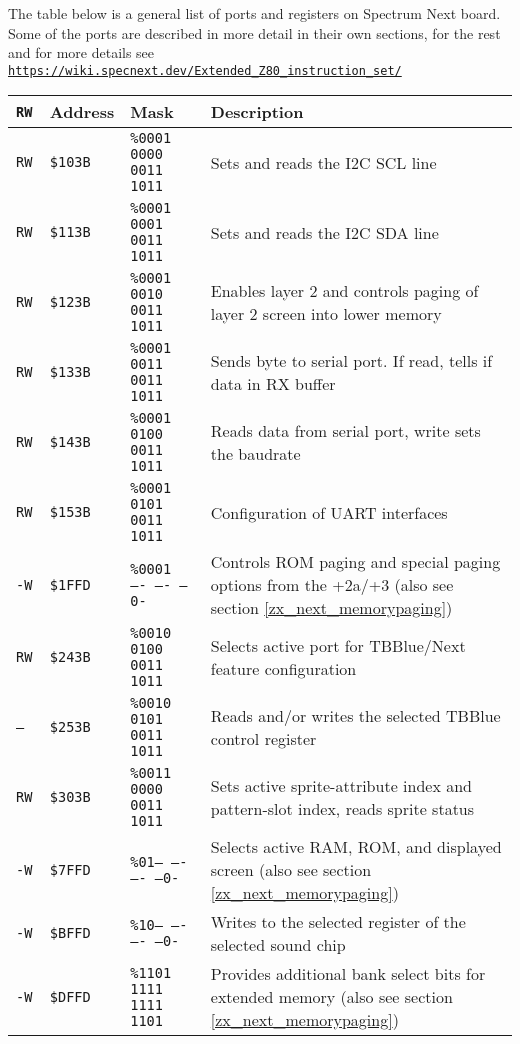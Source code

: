 \documentclass[oneside,a4paper]{book}
\newcommand{\notet}{\rule{0pt}{2.4ex}}
\begin{document}
The table below is a general list of ports and registers on Spectrum Next board. Some of the ports are described in more detail in their own sections, for the rest and for more details see \\
{\tt \url{https://wiki.specnext.dev/Extended_Z80_instruction_set/}}

\newcommand{\zxport}[4]{{\tt #1}\notet & {\tt \$#2} & {\tt \%#3} & #4}

\begin{tabular}{lllp{7.5cm}}
	{\tt RW} & Address & Mask & Description \\
	
	\hline
	
	\zxport{RW}{103B}{0001 0000 0011 1011}{Sets and reads the I2C SCL line} \\
	\zxport{RW}{113B}{0001 0001 0011 1011}{Sets and reads the I2C SDA line} \\
	\zxport{RW }{123B}{0001 0010 0011 1011}{Enables layer 2 and controls paging of layer 2 screen into lower memory} \\
	\zxport{RW}{133B}{0001 0011 0011 1011}{Sends byte to serial port. If read, tells if data in RX buffer} \\
	\zxport{RW}{143B}{0001 0100 0011 1011}{Reads data from serial port, write sets the baudrate} \\
	\zxport{RW}{153B}{0001 0101 0011 1011}{Configuration of UART interfaces} \\
	\zxport{-W}{1FFD}{0001 ---- ---- --0-}{Controls ROM paging and special paging options from the +2a/+3 (also see section \ref{zx_next_memorypaging})} \\
	\zxport{RW}{243B}{0010 0100 0011 1011}{Selects active port for TBBlue/Next feature configuration} \\
	\zxport{--}{253B}{0010 0101 0011 1011}{Reads and/or writes the selected TBBlue control register} \\
	\zxport{RW}{303B}{0011 0000 0011 1011}{Sets active sprite-attribute index and pattern-slot index, reads sprite status} \\
	\zxport{-W}{7FFD}{01-- ---- ---- --0-}{Selects active RAM, ROM, and displayed screen (also see section \ref{zx_next_memorypaging})} \\
	\zxport{-W}{BFFD}{10-- ---- ---- --0-}{Writes to the selected register of the selected sound chip} \\
	\zxport{-W}{DFFD}{1101 1111 1111 1101}{Provides additional bank select bits for extended memory (also see section \ref{zx_next_memorypaging})} \\

\end{tabular}
\end{document}
